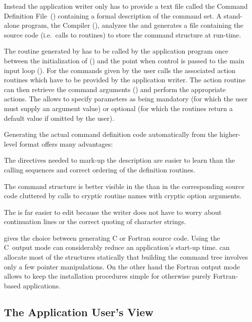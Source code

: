 Instead the application writer only has to provide a text file
called the Command Definition File~(\CDF{}) containing a formal
description of the command set.
A stand-alone program, the
\KUIP{} Compiler (\KUIPC{}),
analyzes the \CDF{} and generates a file containing the source code
(i.e.\ calls to \KUIP{} routines) to store the
command structure at run-time.

The routine generated by \KUIPC{} has to be called by the
application program once between the initialization of \KUIP{}
() and the point when control is passed to the 
\KUIP{} main input loop ().
For the commands given by the user \KUIP{} calls the associated 
action routines which have to be provided by the application writer.
The action routine can then retrieve the command arguments
(\KUGETx{}) and perform the appropriate actions.
The \CDF{} allows to specify parameters as being mandatory (for which the user
must supply an argument value) or optional (for which the \KUGETx{}
routines return a default value if omitted by the user).

Generating the actual command definition code automatically from the
higher-level \CDF{} format offers many advantages:
\begin{UL}
\item
The directives needed to mark-up the \CDF{} description are easier to
learn than the calling sequences and correct ordering of the
definition routines.
\item
The command structure is better visible in the \CDF{} than in the
corresponding source code cluttered by calls to cryptic routine
names with cryptic option arguments. 
\item
The \CDF{} is far easier to edit because the writer does not have to
worry about continuation lines or the correct quoting of character
strings.
\item
\KUIPC{} gives the choice between generating C or Fortran source code.
Using the C~output mode can considerably reduce an application's
start-up time.
\KUIPC{} can allocate most of the structures statically that building
the command tree involves only a few pointer manipulations.
On the other hand the Fortran output mode allows to keep the installation
procedures simple for otherwise purely Fortran-based applications.
\end{UL}
%
%
\subsection{The Application User's View}

